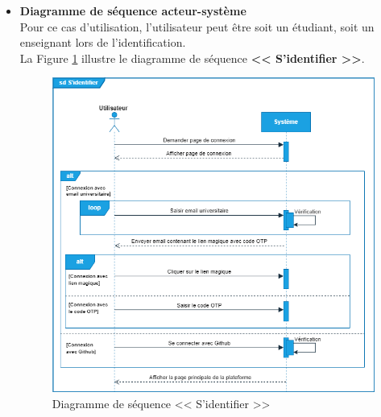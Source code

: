 \begin{itemize}[itemsep=1pt, parsep=1pt]
    \newpage
    \item \textbf{Diagramme de séquence acteur-système}\\
     Pour ce cas d'utilisation, l'utilisateur peut être soit un étudiant, soit un enseignant lors de l'identification.\\
     La Figure \ref{fig:diagramme de séquence << S’identifier >>} illustre le diagramme de séquence \textbf{<< S’identifier >>}.
     \begin{figure}[H]
        \centering
        \includegraphics[width=1.1\textwidth,height=0.82\textheight]{images/chp3/fig6.png}
        \caption{Diagramme de séquence << S’identifier >>}        
        \label{fig:diagramme de séquence << S’identifier >>}    
    \end{figure}

\end{itemize}

